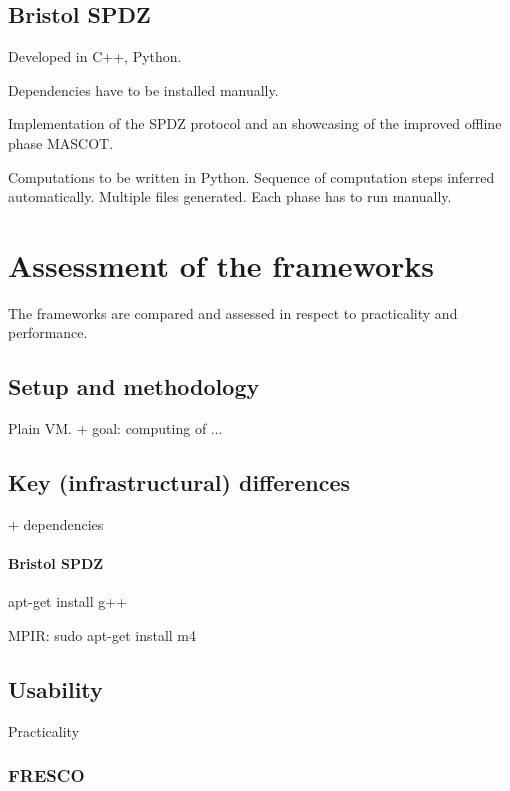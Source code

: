 \subsection{Bristol SPDZ}

Developed in C++, Python.

Dependencies have to be installed manually.

Implementation of the SPDZ protocol and an showcasing of the improved offline phase MASCOT\cite{KOS2016}.


Computations to be written in Python.
Sequence of computation steps inferred automatically. %
Multiple files generated.
Each phase has to run manually.


\section{Assessment of the frameworks}
\label{sec:assessment}

The frameworks are compared and assessed in respect to practicality and performance.

\subsection{Setup and methodology}

Plain VM. + goal: computing of ...

\subsection{Key (infrastructural) differences}

+ dependencies

\paragraph{Bristol SPDZ}

apt-get install g++

MPIR:
sudo apt-get install m4



\subsection{Usability}

Practicality

\subsubsection{FRESCO}

